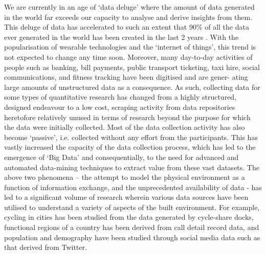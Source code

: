 We are currently in an age of `data deluge' where the amount of data generated in the world far exceeds our capacity to analyse and derive insights from them.
This deluge of data has accelerated to such an extent that 90\% of all the data ever  generated in the world has been created in the last 2 years \cite{ibm2016}.
With the popularisation of wearable technologies  and the `internet of things', this trend is not expected to change any time soon.
Moreover, many day-to-day  activities of people such  as banking, bill payments, public transport ticketing, taxi hire, social communications, and fitness tracking have been digitised and are gener- ating large amounts of unstructured data as a consequence.
As such, collecting data for some types of quantitative research has changed from a highly structured, designed endeavour to a low cost, scraping activity from data repositories heretofore relatively unused in terms of research beyond the purpose for which the data were initially collected.
Most of the data collection activity has also become `passive', i.e. collected without any effort from the participants.
This has vastly increased the capacity of the data collection process, which has led to the emergence of `Big Data' and consequentially, to the need for advanced and automated data-mining techniques to extract value from these vast datasets.
The above two phenomena – the attempt to model the physical environment as a function of information exchange, and the unprecedented availability of data - has led to a significant volume of research wherein various data sources have been utilised to understand a variety of aspects of the built environment.
For example, cycling in cities has been studied from the data generated by cycle-share docks, functional regions of a country has been derived from call detail record data, and population and demography have been studied through social media data such as that derived from Twitter.

